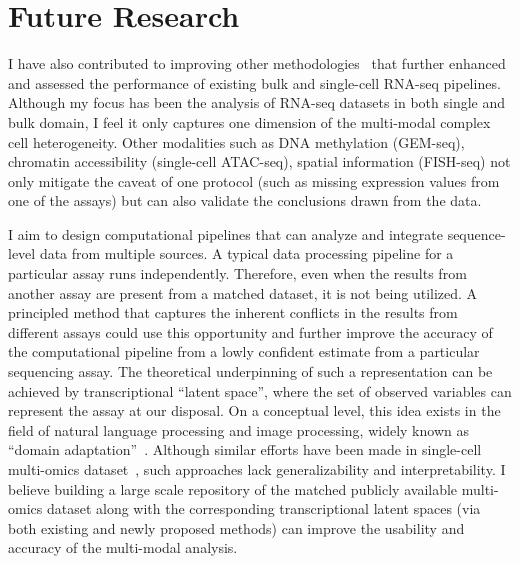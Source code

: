 \documentclass[11pt,a4paper,sans]{moderncv}        %
\begin{document}
\section{Future Research}
I have also contributed to improving other methodologies~\cite{mappingsmatter,rapclust,alevin2,selaln} that further enhanced and assessed the performance of existing bulk and single-cell RNA-seq pipelines. Although my focus has been the analysis of RNA-seq datasets in both single and bulk domain, I feel it only captures one dimension of the multi-modal complex cell heterogeneity. Other modalities such as DNA methylation (GEM-seq), chromatin accessibility (single-cell ATAC-seq), spatial information (FISH-seq) not only mitigate the caveat of one protocol (such as missing expression values from one of the assays) but can also validate the conclusions drawn from the data. 

\setlength{\parindent}{5ex}
I aim to design computational pipelines that can analyze and integrate sequence-level data from multiple sources. A typical data processing pipeline for a particular assay runs independently. Therefore, even when the results from another assay are present from a matched dataset, it is not being utilized. A principled method that captures the inherent conflicts in the results from different assays could use this opportunity and further improve the accuracy of the computational pipeline from a lowly confident estimate from a particular sequencing assay. The theoretical underpinning of such a representation can be achieved by transcriptional ``latent space'', where the set of observed variables can represent the assay at our disposal. On a conceptual level, this idea exists in the field of natural language processing and image processing, widely known as ``domain adaptation''~\cite{daume2009frustratingly,ganin2014unsupervised}. Although similar efforts have been made in single-cell multi-omics dataset~\cite{liu2019jointly,amodio2018magan,eraslan2019deep}, such approaches lack generalizability and interpretability. I believe building a large scale repository of the matched publicly available multi-omics dataset along with the corresponding transcriptional latent spaces (via both existing and newly proposed methods) can improve the usability and accuracy of the multi-modal analysis.
\end{document}
